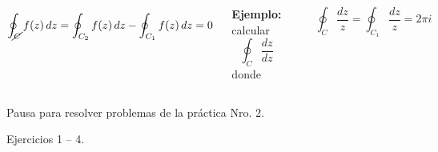 \documentclass[9pt, aspectratio=169]{beamer}
\begin{document}
\begin{frame}
\begin{columns}[t]
 \cx
 \[\oint_{\cancel{C}} f(z) \, dz = \oint_{C_2} f(z) \, dz - \oint_{C_1} f(z) \, dz = 0 \]
 \pause

 \textbf{Ejemplo:} calcular
 \[ \oint_C \frac{dz}{dz} \]
 donde
  \begin{center}
      \includegraphics[scale=0.40]{figs/fig-05.pdf}
  \end{center}

  \[ \oint_C \frac{dz}{z} = \oint_{C_1} \frac{dz}{z} = 2 \pi i \]

\end{columns}
\end{frame}

\begin{frame}[standout]
    \begin{center}
        Pausa para resolver problemas de la práctica Nro. 2.

        Ejercicios 1 -- 4. 
    \end{center}
\end{frame}
\end{document}
